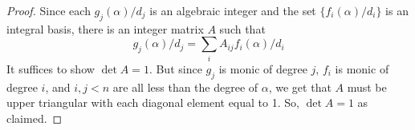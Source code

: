 \begin{proof} 
    Since each $g_j(\alpha)/d_j$ is an algebraic integer and the set $\{f_i(\alpha)/d_i\}$ is an integral basis, there is an integer matrix $A$ such that
    \[ g_j(\alpha)/d_j = \sum_i A_{ij}f_i(\alpha)/d_i \]
    It suffices to show $\det A = 1$. But since $g_j$ is monic of degree $j$, $f_i$ is monic of degree $i$, and $i,j < n$ are all less than the degree of $\alpha$, we get that $A$ must be upper triangular with each diagonal element equal to 1. So, $\det A = 1$ as claimed.
\end{proof}
